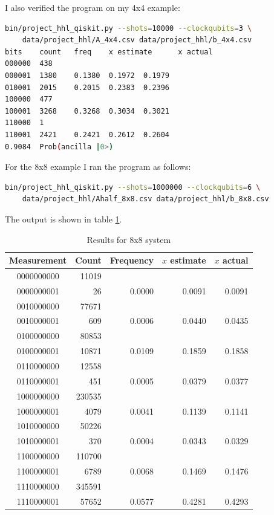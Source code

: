 \documentclass[12pt]{extarticle}
\begin{document}
I also verified the program on my 4x4 example:
\begin{lstlisting}[language=Bash]
bin/project_hhl_qiskit.py --shots=10000 --clockqubits=3 \
    data/project_hhl/A_4x4.csv data/project_hhl/b_4x4.csv
bits    count   freq    x estimate      x actual
000000  438
000001  1380    0.1380  0.1972  0.1979
010001  2015    0.2015  0.2383  0.2396
100000  477
100001  3268    0.3268  0.3034  0.3021
110000  1
110001  2421    0.2421  0.2612  0.2604
0.9084  Prob(ancilla |0>)
\end{lstlisting}

For the 8x8 example I ran the program as follows:
\begin{lstlisting}[language=Bash]
bin/project_hhl_qiskit.py --shots=1000000 --clockqubits=6 \
    data/project_hhl/Ahalf_8x8.csv data/project_hhl/b_8x8.csv
\end{lstlisting}

The output is shown in table \ref{tab:results8x8}.

\begin{table}[h]
\begin{center}
\begin{tabular}{|c|r|r|r|r|}
\hline
Measurement & Count & Frequency & $x$ estimate & $x$ actual \\
\hline
0000000000  &  11019 & & & \\
0000000001  &     26 & 0.0000 & 0.0091 & 0.0091 \\
0010000000  &  77671 & & & \\
0010000001  &    609 & 0.0006 & 0.0440 & 0.0435 \\
0100000000  &  80853 & & & \\
0100000001  &  10871 & 0.0109 & 0.1859 & 0.1858 \\
0110000000  &  12558 & & & \\
0110000001  &    451 & 0.0005 & 0.0379 & 0.0377 \\
1000000000  & 230535 & & & \\
1000000001  &   4079 & 0.0041 & 0.1139 & 0.1141 \\
1010000000  &  50226 & & & \\
1010000001  &    370 & 0.0004 & 0.0343 & 0.0329 \\
1100000000  & 110700 & & & \\
1100000001  &   6789 & 0.0068 & 0.1469 & 0.1476 \\
1110000000  & 345591 & & & \\
1110000001  &  57652 & 0.0577 & 0.4281 & 0.4293 \\
\hline
\end{tabular}
\caption{Results for 8x8 system}
\label{tab:results8x8}
\end{center}
\end{table}
\end{document}
